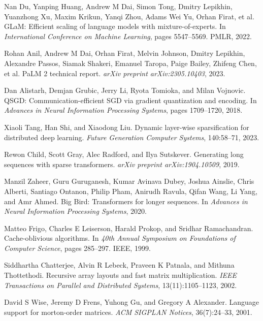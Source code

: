 \documentclass{article}
\numberwithin{equation}{section}
\theoremstyle{plain}
\theoremstyle{definition}
\theoremstyle{remark}
\begin{document}
\begin{thebibliography}{99}
Nan Du, Yanping Huang, Andrew M Dai, Simon Tong, Dmitry Lepikhin, Yuanzhong Xu, Maxim Krikun, Yanqi Zhou, Adams Wei Yu, Orhan Firat, et al.
\newblock GLaM: Efficient scaling of language models with mixture-of-experts.
\newblock In \emph{International Conference on Machine Learning}, pages 5547--5569. PMLR, 2022.

Rohan Anil, Andrew M Dai, Orhan Firat, Melvin Johnson, Dmitry Lepikhin, Alexandre Passos, Siamak Shakeri, Emanuel Taropa, Paige Bailey, Zhifeng Chen, et al.
\newblock PaLM 2 technical report.
\newblock \emph{arXiv preprint arXiv:2305.10403}, 2023.

Dan Alistarh, Demjan Grubic, Jerry Li, Ryota Tomioka, and Milan Vojnovic.
\newblock QSGD: Communication-efficient SGD via gradient quantization and encoding.
\newblock In \emph{Advances in Neural Information Processing Systems}, pages 1709--1720, 2018.

Xiaoli Tang, Han Shi, and Xiaodong Liu.
\newblock Dynamic layer-wise sparsification for distributed deep learning.
\newblock \emph{Future Generation Computer Systems}, 140:58--71, 2023.

Rewon Child, Scott Gray, Alec Radford, and Ilya Sutskever.
\newblock Generating long sequences with sparse transformers.
\newblock \emph{arXiv preprint arXiv:1904.10509}, 2019.

Manzil Zaheer, Guru Guruganesh, Kumar Avinava Dubey, Joshua Ainslie, Chris Alberti, Santiago Ontanon, Philip Pham, Anirudh Ravula, Qifan Wang, Li Yang, and Amr Ahmed.
\newblock Big Bird: Transformers for longer sequences.
\newblock In \emph{Advances in Neural Information Processing Systems}, 2020.

Matteo Frigo, Charles E Leiserson, Harald Prokop, and Sridhar Ramachandran.
\newblock Cache-oblivious algorithms.
\newblock In \emph{40th Annual Symposium on Foundations of Computer Science}, pages 285--297. IEEE, 1999.

Siddhartha Chatterjee, Alvin R Lebeck, Praveen K Patnala, and Mithuna Thottethodi.
\newblock Recursive array layouts and fast matrix multiplication.
\newblock \emph{IEEE Transactions on Parallel and Distributed Systems}, 13(11):1105--1123, 2002.

David S Wise, Jeremy D Frens, Yuhong Gu, and Gregory A Alexander.
\newblock Language support for morton-order matrices.
\newblock \emph{ACM SIGPLAN Notices}, 36(7):24--33, 2001.


\end{thebibliography}
\end{document}
